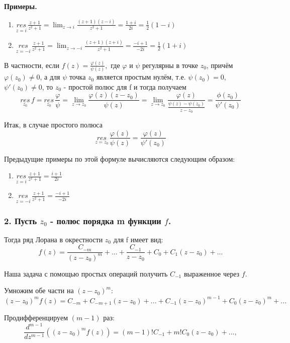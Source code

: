 \documentclass[a4paper, 12pt]{report}
\begin{document}
\textbf{Примеры.}
\begin{enumerate}
    \item $\overset{}{\underset{z = i}{res}}\, \frac{z+1}{z^2+1} = \lim_{z \to i} \frac{(z+1)(z-i)}{z^2+1} = \frac{1+i}{2i} = \frac{1}{2}(1-i) $
    \item $\overset{}{\underset{z = -i}{res}}\, \frac{z+1}{z^2+1} = \lim_{z \to -i} \frac{(z+1)(z+i)}{z^2+1} = \frac{-i+1}{-2i} = \frac{1}{2}(1+i) $
\end{enumerate}

В частности, если $f(z) = \frac{\varphi (z)}{\psi (z)},$  где $\varphi$ и $\psi$ регулярны в точке $z_0$, причём $\varphi(z_0) \neq 0$, а для $\psi$ точка $z_0$ является простым нулём, т.е. $\psi(z_0) = 0$, $\psi'(z_0) \neq 0$, то $z_0$ - простой полюс для f и тогда получаем
$$\overset{}{\underset{z_0}{res}}\, f = \overset{}{\underset{z_0}{res}}\,\frac{\varphi}{\psi} = \lim_{z \to z_0}\frac{\varphi(z)(z-z_0)}{\psi(z)} = \lim_{z \to z_0}\frac{\varphi(z)}{\frac{\psi(z) - \psi(z_0)}{z-z_0}} = \frac{\phi(z_0)}{\psi'(z_0)}$$

Итак, в случае простого полюса 
$$\overset{}{\underset{z = z_0}{res}}\,\frac{\varphi(z)}{\psi(z)} = \frac{\varphi(z)}{\psi'(z_0)} $$

Предыдущие примеры по этой формуле вычисляются следующим образом:
\begin{enumerate}
    \item $\overset{}{\underset{z = i}{res}}\,\frac{z+1}{z^2+1} = \frac{i+1}{2i}$
    \item $\overset{}{\underset{z = -i}{res}}\,\frac{z+1}{z^2+1} = \frac{-i+1}{-2i}$
\end{enumerate}


\subsubsection*{2. Пусть $z_0$ - полюс порядка m функции $f$.}

Тогда ряд Лорана в окрестности $z_0$ для f имеет вид:
$$f(z) = \frac{C_{-m}}{(z-z_0)^m} + ... + \frac{C_{-1}}{z-z_0} + C_0 + C_1(z-z_0) + ...    $$

Наша задача с помощью простых операций получить $C_{-1}$ выраженное через $f$.
\par\bigskip
Умножим обе части на $(z-z_0)^m$:
$$(z-z_0)^mf(z) = C_{-m} + C_{-m+1}(z-z_0) + ... + C_{-1}(z-z_0)^{m-1} + C_0(z-z_0)^m + ...   $$

Продифференцируем $(m-1)$ раз:
$$\frac{d^{m-1} }{d z^{m-1}} ((z-z_0)^mf(z)) = (m-1)!C_{-1} + m!C_0(z-z_0) + ..., $$
\end{document}
